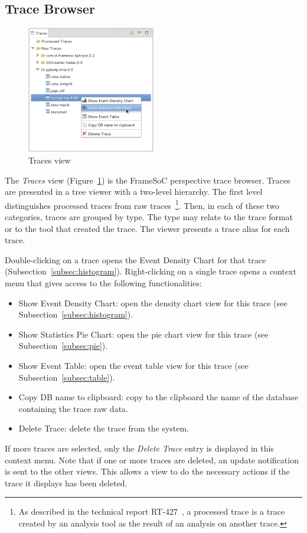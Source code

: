 \documentclass[twoside]{article}
\begin{document}
\begin{sloppypar}
\subsection{Trace Browser}
\label{subsec:explorer}

\begin{figure}[h!]
  \centering
    \includegraphics[width=0.5\textwidth]{images/popup_explorer.png}
  \caption{Traces view}
  \label{fig:popup_explorer}
\end{figure}

The \emph{Traces} view (Figure~\ref{fig:popup_explorer}) is the FrameSoC perspective trace browser.
Traces are presented in a tree viewer with a two-level hierarchy. 
The first level distinguishes processed traces from raw traces~\footnote{As described in the technical report RT-427~\cite{pagano:hal}, a processed trace is a trace created by an analysis tool as the result of an analysis on another trace.}. 
Then, in each of these two categories, traces are grouped by type. 
The type may relate to the trace format or to the tool that created the trace. 
The viewer presents a trace alias for each trace.

Double-clicking on a trace opens the Event Density Chart for that trace (Subsection~\ref{subsec:histogram}).
Right-clicking on a single trace opens a context menu that gives access to the following functionalities:
\begin{itemize}
 \item Show Event Density Chart: open the density chart view for this trace (see Subsection~\ref{subsec:histogram}).
 \item Show Statistics Pie Chart: open the pie chart view for this trace (see Subsection~\ref{subsec:pie}).
 \item Show Event Table: open the event table view for this trace (see Subsection~\ref{subsec:table}).
 \item Copy DB name to clipboard: copy to the clipboard the name of the database containing the trace raw data.
 \item Delete Trace: delete the trace from the system.
\end{itemize}
If more traces are selected, only the \emph{Delete Trace} entry is displayed in this context menu.
Note that if one or more traces are deleted, an update notification is sent to the other views.
This allows a view to do the necessary actions if the trace it displays has been deleted.


\end{sloppypar}
\end{document}
